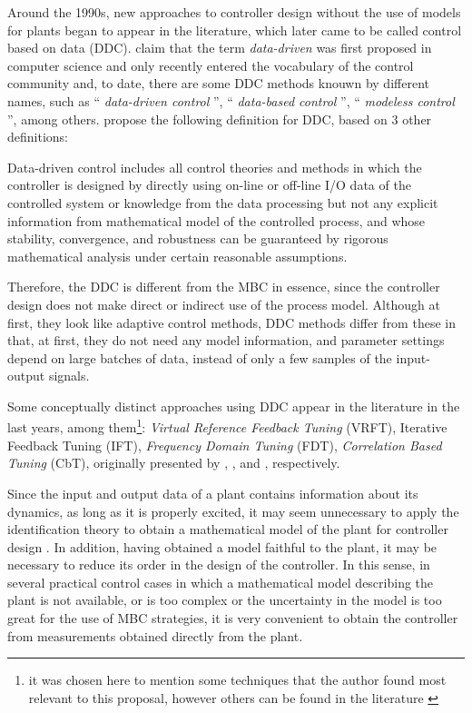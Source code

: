 Around the 1990s, new approaches to controller design without the use of models for plants began to appear in the literature, which later came to be called control based on data (DDC).
%
\cite{hou2013} claim that the term \emph{data-driven} was first proposed in computer science and only recently entered the vocabulary of the control community and, to date, there are some DDC methods knouwn by different names, such as `` \emph{data-driven control} '', `` \emph{data-based control} '', `` \emph{modeless control} '', among others. \cite{hou2013} propose the following definition for DDC, based on 3 other definitions:


\begin{defn}\citep{hou2013}
Data-driven control includes all control theories and methods in which the controller is designed by directly using on-line or off-line I/O data of the controlled system or knowledge from the data processing but not any explicit information from mathematical model of the controlled process, and whose stability, convergence, and robustness can be guaranteed by rigorous mathematical analysis under certain reasonable assumptions.
\end{defn}

Therefore, the DDC is different from the MBC in essence, since the controller design does not make direct or indirect use of the process model.  
Although at first, they look like adaptive control methods, DDC methods differ from these in that, at first, they do not need any model information, and parameter settings depend on large batches of data, instead of only a few samples of the input-output signals. %


Some conceptually distinct approaches using DDC appear in the literature in the last years, among them\footnote{it was chosen here to mention some techniques that the author found most relevant to this proposal, however others can be found in the literature \citep{spall1992, safonov1995, karimi2007, huang2008, schaal1994, shi2000}}:
\emph{Virtual Reference Feedback Tuning} (VRFT), Iterative Feedback Tuning (IFT), \emph{Frequency Domain Tuning} (FDT), \emph{Correlation Based Tuning} (CbT), originally presented by \cite{campi2002}, \cite{hjalmarsson1994}, \cite{kammer2000} and \cite{karimi2002}, respectively.

Since the input and output data of a plant contains information about its dynamics, as long as it is properly excited, it may seem unnecessary to apply the identification theory to obtain a mathematical model of the plant for controller design \citep{ikeda2001}.
In addition, having obtained a model faithful to the plant, it may be necessary to reduce its order in the design of the controller.
In this sense, in several practical control cases in which a mathematical model describing the plant is not available, or is too complex or the uncertainty in the model is too great for the use of MBC strategies, it is very convenient to obtain the controller from measurements obtained directly from the plant.

